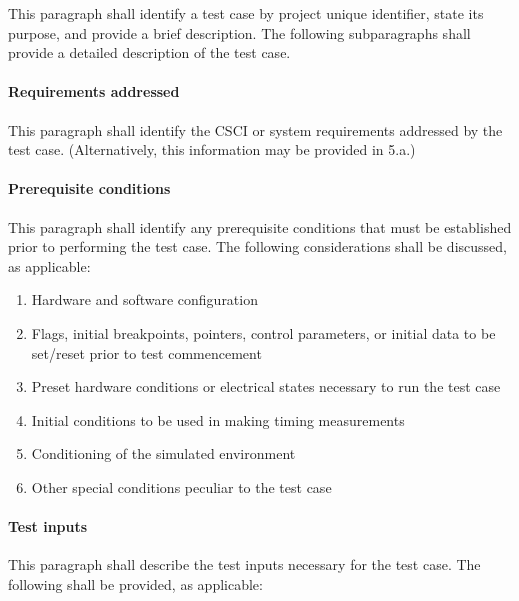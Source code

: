\documentclass{fidata-report-template}
\begin{document}
This paragraph shall identify a test case by project unique identifier,
state its purpose, and provide a brief description. The following
subparagraphs shall provide a detailed description of the test case.

\paragraph{Requirements addressed}

This paragraph shall identify the CSCI or system requirements addressed
by the test case. (Alternatively, this information may be provided in
5.a.)

\paragraph{Prerequisite conditions}

This paragraph shall identify any prerequisite conditions that must be
established prior to performing the test case. The following
considerations shall be discussed, as applicable:

\begin{enumerate}
\itemsep1pt\parskip0pt
\item
  Hardware and software configuration
\item
  Flags, initial breakpoints, pointers, control parameters, or initial
  data to be set/reset prior to test commencement
\item
  Preset hardware conditions or electrical states necessary to run the
  test case
\item
  Initial conditions to be used in making timing measurements
\item
  Conditioning of the simulated environment
\item
  Other special conditions peculiar to the test case
\end{enumerate}

\paragraph{Test inputs}

This paragraph shall describe the test inputs necessary for the test
case. The following shall be provided, as applicable:
\end{document}
